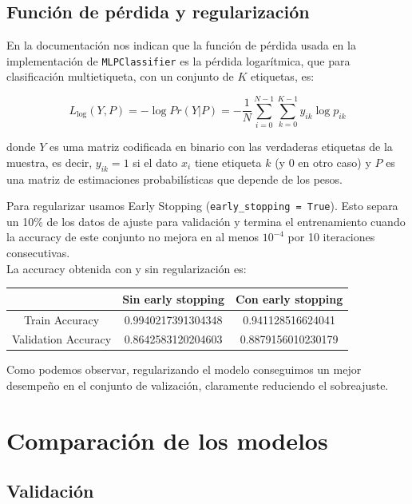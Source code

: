 \documentclass[a4]{article}
\begin{document}
\subsection{Función de pérdida y regularización}

En la documentación nos indican que la función de pérdida usada en la
implementación de \texttt{MLPClassifier} es la pérdida logarítmica,
que para clasificación multietiqueta, con un conjunto de $K$
etiquetas, es:

\[ L_{\log}(Y,P) = -\log Pr(Y|P) = -\frac{1}{N}\sum\limits_{i=0}^{N-1}\sum\limits_{k=0}^{K-1} y_{ik}\log p_{ik}\]

donde $Y$ es uma matriz codificada en binario con las verdaderas
etiquetas de la muestra, es decir, $y_{ik} = 1$ si el dato $x_i$ tiene
etiqueta $k$ (y $0$ en otro caso) y $P$ es una matriz de estimaciones
probabilísticas que depende de los pesos.

Para regularizar usamos Early Stopping (\texttt{early\_stopping =
  True}). Esto separa un 10\% de los datos de ajuste para validación y
termina el entrenamiento cuando la accuracy de este conjunto no mejora
en al menos $10^{-4}$ por 10 iteraciones consecutivas. \\ La accuracy
obtenida con y sin regularización es:

\begin{center}
\begin{tabular}{|c|c|c|}
  \hline
  \multicolumn{1}{|c|}{}& \textbf{Sin early stopping} &
                                                                       \textbf{Con early stopping}  \\ \hline
  Train Accuracy      & 0.9940217391304348 & 0.941128516624041 \\
  Validation Accuracy & 0.8642583120204603 &  0.8879156010230179 \\ \hline
\end{tabular}
\end{center}

Como podemos observar, regularizando el modelo conseguimos un mejor
desempeño en el conjunto de valización, claramente reduciendo el
sobreajuste.

\section{Comparación de los modelos}

\subsection{Validación}
\end{document}

